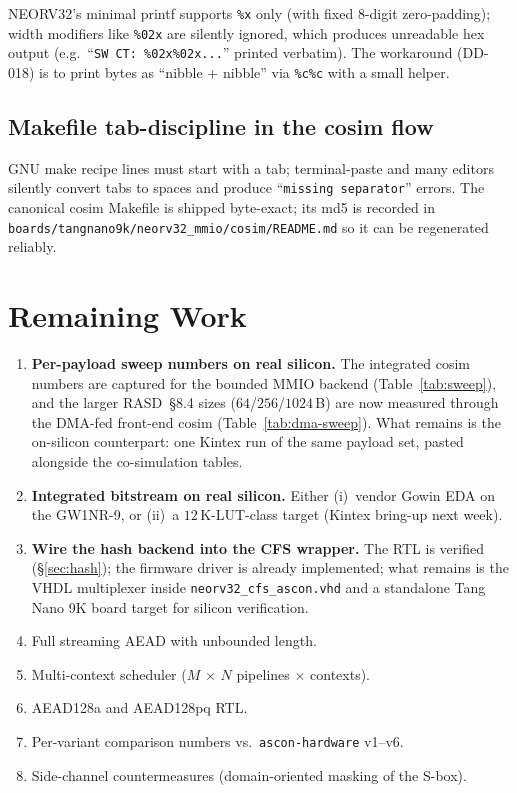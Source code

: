 \documentclass[11pt,a4paper]{article}
\begin{document}
NEORV32's minimal printf supports \texttt{\%x} only (with fixed
$8$-digit zero-padding); width modifiers like \texttt{\%02x} are
silently ignored, which produces unreadable hex output (e.g.\
``\texttt{SW CT: \%02x\%02x...}'' printed verbatim). The workaround
(DD-018) is to print bytes as ``nibble + nibble'' via \texttt{\%c\%c}
with a small helper.

\subsection{Makefile tab-discipline in the cosim flow}

GNU make recipe lines must start with a tab; terminal-paste and many
editors silently convert tabs to spaces and produce
``\texttt{missing separator}'' errors. The canonical cosim Makefile is
shipped byte-exact; its md5 is recorded in
\texttt{boards/tangnano9k/neorv32\_mmio/cosim/README.md} so it can be
regenerated reliably.

\section{Remaining Work}

\begin{enumerate}[noitemsep]
  \item \textbf{Per-payload sweep numbers on real silicon.} The
        integrated cosim numbers are captured for the bounded MMIO
        backend (Table~\ref{tab:sweep}), and the larger RASD~§8.4
        sizes ($64$/$256$/$1024$\,B) are now measured through the
        DMA-fed front-end cosim (Table~\ref{tab:dma-sweep}). What
        remains is the on-silicon counterpart: one Kintex run of the
        same payload set, pasted alongside the co-simulation tables.
  \item \textbf{Integrated bitstream on real silicon.} Either
        (i)~vendor Gowin EDA on the GW1NR-9, or (ii)~a
        $12$\,K-LUT-class target (Kintex bring-up next week).
  \item \textbf{Wire the hash backend into the CFS wrapper.} The RTL
        is verified (§\ref{sec:hash}); the firmware driver is
        already implemented; what remains is the VHDL multiplexer
        inside \texttt{neorv32\_cfs\_ascon.vhd} and a standalone
        Tang Nano 9K board target for silicon verification.
  \item Full streaming AEAD with unbounded length.
  \item Multi-context scheduler ($M\,{\times}\,N$ pipelines $\times$ contexts).
  \item AEAD128a and AEAD128pq RTL.
  \item Per-variant comparison numbers vs.\ \texttt{ascon-hardware} v1--v6.
  \item Side-channel countermeasures (domain-oriented masking of the S-box).
\end{enumerate}
\end{document}
